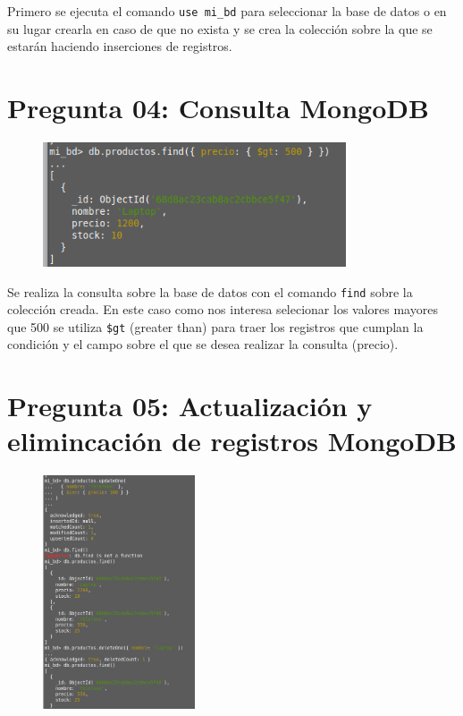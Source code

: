 \documentclass[11pt]{article}
\begin{document}
Primero se ejecuta el comando \verb'use mi_bd' para seleccionar la base de datos o en su lugar crearla en caso de que no exista y se crea la colección sobre la que se estarán haciendo inserciones de registros.

\section*{Pregunta 04: Consulta MongoDB}

\begin{figure}[H]
    \centering
    \includegraphics[width=0.8\textwidth]{P04.png}
\end{figure}

Se realiza la consulta sobre la base de datos con el comando \verb'find' sobre la colección creada. En este caso como nos interesa selecionar los valores mayores que 500 se utiliza \verb'$gt' (greater than) para traer los registros que cumplan la condición y el campo sobre el que se desea realizar la consulta (precio).

\section*{Pregunta 05: Actualización y elimincación de registros MongoDB}

\begin{figure}[H]
    \centering
    \includegraphics[width=0.4\textwidth]{P05.png}
\end{figure}
\end{document}
